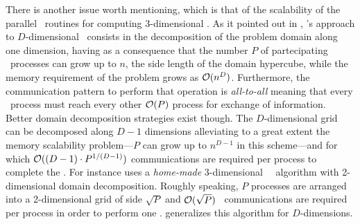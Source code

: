 There is another issue worth mentioning, which is that of the scalability of the
parallel \mpi\ routines for computing $3$-dimensional \dft. As it pointed out in
\cite{springel_2020,adamek_2016,pippig_13}, \fftw's approach to
$D$-dimensional
\dft\ consists in the
decomposition of the problem domain along one dimension, having as a consequence that
the number $P$ of partecipating \mpi\ processes can grow up to $n$, the side length
of the domain hypercube, while the memory requirement of the problem grows as
$\mathcal{O}(n^D)$. Furthermore, the communication pattern to perform that operation
is \emph{all-to-all} meaning that every \mpi\ process must reach every other
$\mathcal{O}(P)$ process for exchange of information.
Better domain decomposition strategies
exist though. The $D$-dimensional grid can be decomposed along $D-1$ dimensions
alleviating to a great extent the memory scalability problem---$P$ can grow up
to $n^{D-1}$ in this scheme---and for which
$\mathcal{O}((D-1)\cdot P^{1/(D-1)})$ communications are required per process to
complete the \dft. For instance \cite{adamek_2016} uses a \emph{home-made}
3-dimensional \mpi\ \fft\ algorithm with 2-dimensional domain decomposition.
Roughly speaking, $P$ processes are arranged into a 2-dimensional grid of side
$\sqrt{P}$ and $\mathcal{O}(\sqrt{P})$ \mpi\ communications are required per
process in order to perform one \dft. \cite{pippig_13} generalizes this
algorithm for $D$-dimensions.
